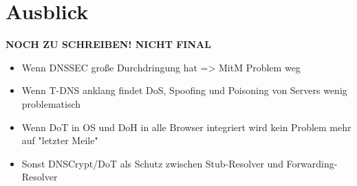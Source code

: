\chapter{Ausblick}
\label{chap:future}

\textbf{NOCH ZU SCHREIBEN! NICHT FINAL}

\begin{itemize}
    \item Wenn DNSSEC große Durchdringung hat => MitM Problem weg
    \item Wenn T-DNS anklang findet DoS, Spoofing und Poisoning von Servers wenig problematisch
    \item Wenn DoT in OS und DoH in alle Browser integriert wird kein Problem mehr auf "letzter Meile" 
    \item Sonst DNSCrypt/DoT als Schutz zwischen Stub-Resolver und Forwarding-Resolver
\end{itemize}